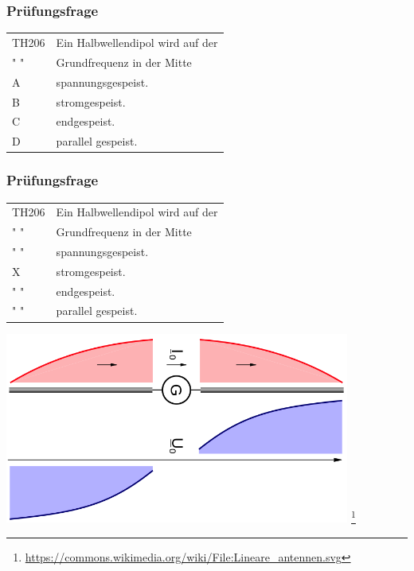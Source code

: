 \begin{frame}
    \frametitle{Prüfungsfrage}

    \begin{center}
    \begin{tabular}{l||l}\hline
        TH206 & Ein Halbwellendipol wird auf der  \\
         " "  & Grundfrequenz in der Mitte \\ \hline\hline
         A & spannungsgespeist.\\\hline
         B & stromgespeist. \\\hline
         C & endgespeist. \\ \hline
         D & parallel gespeist.\\\hline
    \end{tabular}
 	\end{center}
\end{frame}

\begin{frame}
    \frametitle{Prüfungsfrage}

    \begin{center}
    \begin{tabular}{l||l}\hline
        TH206 & Ein Halbwellendipol wird auf der  \\
         " "  & Grundfrequenz in der Mitte \\ \hline\hline
         " " & spannungsgespeist.\\\hline
         X & stromgespeist. \\\hline
         " " & endgespeist. \\ \hline
         " " & parallel gespeist.\\\hline
    \end{tabular}
        \includegraphics[width=0.85\textwidth]{e11/DipolUI.png}
        \footnote{\tiny \url{https://commons.wikimedia.org/wiki/File:Lineare_antennen.svg}}
 	\end{center}
\end{frame}
    

